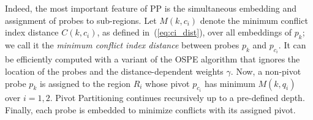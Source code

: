 Indeed, the most important feature of PP is the simultaneous embedding and
assignment of probes to sub-regions. Let $M(k,c_i)$ denote the minimum
conflict index distance $C(k,c_i)$, as defined in~(\ref{eq:ci_dist}), over all
embeddings of $p_k$; we call it the \emph{minimum conflict index distance}
between probes $p_k$ and $p_{c_i}$. It can be efficiently computed with a
variant of the OSPE algorithm that ignores the location of the probes and the
distance-dependent weights $\gamma$. Now, a non-pivot probe $p_k$ is assigned
to the region $R_i$ whose pivot $p_{c_i}$ has minimum $M(k,q_i)$ over $i=1,2$.
Pivot Partitioning continues recursively up to a pre-defined depth. Finally,
each probe is embedded to minimize conflicts with its assigned pivot.
